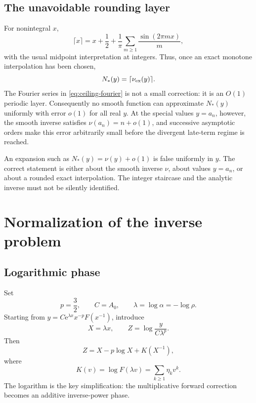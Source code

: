 \documentclass[11pt,a4paper,oneside,openany]{book}
\theoremstyle{definition}
\theoremstyle{remark}
\newcommand{\e}{\mathrm e}
\begin{document}
\section{The unavoidable rounding layer}
For nonintegral $x$,
\begin{equation}
 \lceil x\rceil
 =x+\frac12+\frac1\pi\sum_{m\ge1}\frac{\sin(2\pi mx)}m,
 \label{eq:ceiling-fourier}
\end{equation}
with the usual midpoint interpretation at integers.  Thus, once an exact
monotone interpolation has been chosen,
\begin{equation}
 N_*(y)=\lceil\nu_{\rm ex}(y)\rceil.
 \label{eq:integer-via-exact}
\end{equation}
The Fourier series in \cref{eq:ceiling-fourier} is not a small correction: it
is an $O(1)$ periodic layer.  Consequently no smooth function can approximate
$N_*(y)$ uniformly with error $o(1)$ for all real $y$.  At the special values
$y=a_n$, however, the smooth inverse satisfies
$\nu(a_n)=n+o(1)$, and successive asymptotic orders make this error arbitrarily
small before the divergent late-term regime is reached.

\begin{warningbox}
An expansion such as $N_*(y)=\nu(y)+o(1)$ is false uniformly in $y$.  The correct
statement is either about the smooth inverse $\nu$, about values $y=a_n$, or
about a rounded exact interpolation.  The integer staircase and the analytic
inverse must not be silently identified.
\end{warningbox}

\chapter{Normalization of the inverse problem}
\label{ch:inverse-normalization}

\section{Logarithmic phase}
Set
\begin{equation}
 p=\frac32,
 \qquad
 C=A_0,
 \qquad
 \lambda=\log\alpha=-\log\rho.
 \label{eq:p-C-lambda}
\end{equation}
Starting from
$y=C\e^{\lambda x}x^{-p}F(x^{-1})$, introduce
\begin{equation}
 X=\lambda x,
 \qquad
 Z=\log\frac{y}{C\lambda^p}.
 \label{eq:XZ}
\end{equation}
Then
\begin{equation}
 Z=X-p\log X+K(X^{-1}),
 \label{eq:normalized-inverse-equation}
\end{equation}
where
\begin{equation}
 K(v)=\log F(\lambda v)=\sum_{k\ge1}\eta_kv^k.
 \label{eq:K-eta}
\end{equation}
The logarithm is the key simplification: the multiplicative forward correction
becomes an additive inverse-power phase.
\end{document}
